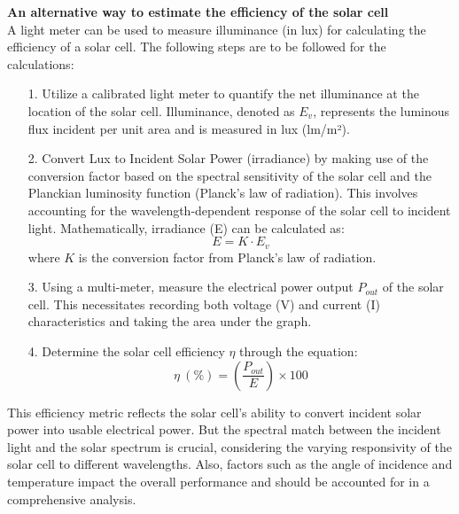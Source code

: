 \textbf{An alternative way to estimate the efficiency of the solar cell}\\ A light meter can be used to measure illuminance (in lux) for calculating the efficiency of a solar cell. The following steps are to be followed for the calculations: 
\begin{itemize} 
\item [1.] Utilize a calibrated light meter to quantify the net illuminance at the location of the solar cell. Illuminance, denoted as $E_v$, represents the luminous flux incident per unit area and is measured in lux (lm/m²).
\item [2.] Convert Lux to Incident Solar Power (irradiance) by making use of the conversion factor based on the spectral sensitivity of the solar cell and the Planckian luminosity function (Planck's law of radiation). This involves accounting for the wavelength-dependent response of the solar cell to incident light. Mathematically, irradiance (E) can be calculated as: 
\[E = K \cdot E_v\] where \(K\) is the conversion factor from Planck's law of radiation. 
\item [3.] Using a multi-meter, measure the electrical power output $P_{out}$ of the solar cell. This necessitates recording both voltage (V) and current (I) characteristics and taking the area under the graph.
\item [4.] Determine the solar cell efficiency $\eta$ through the equation: 
\[\eta \ (\%) = \left (\frac{P_{out}}{E}\right) \times 100\] 
\end{itemize} 
This efficiency metric reflects the solar cell's ability to convert incident solar power into usable electrical power. But the spectral match between the incident light and the solar spectrum is crucial, considering the varying responsivity of the solar cell to different wavelengths. Also, factors such as the angle of incidence and temperature impact the overall performance and should be accounted for in a comprehensive analysis.